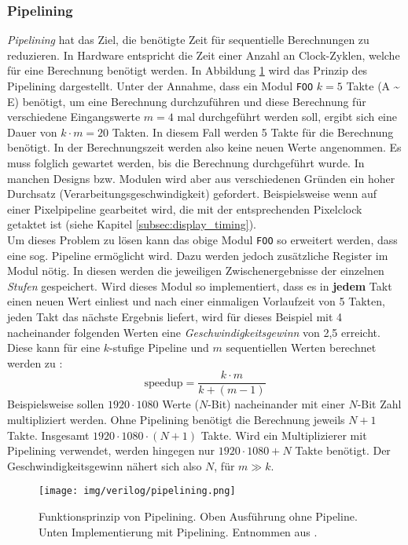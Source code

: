 \subsubsection{Pipelining}\label{subsec:pipelining}
\emph{Pipelining} hat das Ziel, die benötigte Zeit für sequentielle Berechnungen zu reduzieren. In Hardware entspricht die Zeit einer Anzahl an Clock-Zyklen, welche für eine Berechnung benötigt werden. In Abbildung \ref{fig:pipeline} wird das Prinzip des Pipelining dargestellt.
Unter der Annahme, dass ein Modul \texttt{FOO} \mbox{$ k=5 $} Takte (A  \textasciitilde\, E) benötigt, um eine Berechnung durchzuführen und diese Berechnung für verschiedene Eingangswerte $ m=4 $ mal durchgeführt werden soll, ergibt sich eine Dauer von $ k\cdot m = 20 $ Takten. In diesem Fall werden 5 Takte für die Berechnung benötigt. In der Berechnungszeit werden also keine neuen Werte angenommen. Es muss folglich gewartet werden, bis die Berechnung durchgeführt wurde. In manchen Designs bzw. Modulen wird aber aus verschiedenen Gründen ein hoher Durchsatz (Verarbeitungsgeschwindigkeit) gefordert. Beispielsweise wenn auf einer Pixelpipeline gearbeitet wird, die mit der entsprechenden Pixelclock getaktet ist (siehe Kapitel \ref{subsec:display_timing}). \\
Um dieses Problem zu lösen kann das obige Modul \texttt{FOO} so erweitert werden, dass eine sog. Pipeline ermöglicht wird. Dazu werden jedoch zusätzliche Register im Modul nötig. In diesen werden die jeweiligen Zwischenergebnisse der einzelnen \emph{Stufen} gespeichert. Wird dieses Modul so implementiert, dass es in \textbf{jedem} Takt einen neuen Wert einliest und nach einer einmaligen Vorlaufzeit von 5 Takten, jeden Takt das nächste Ergebnis liefert, wird für dieses Beispiel mit 4 nacheinander folgenden Werten eine \emph{Geschwindigkeitsgewinn} von 2,5 erreicht. Diese kann für eine $k $-stufige Pipeline und $ m $ sequentiellen Werten berechnet werden zu \cite[p.286]{molitor}:
\begin{equation}
\mathrm{speedup} = \frac{k\cdot m}{k+ (m-1)}
\end{equation}
Beispielsweise sollen $ 1920 \cdot 1080$ Werte ($ N $-Bit) nacheinander mit einer $ N $-Bit Zahl multipliziert werden. Ohne Pipelining benötigt die Berechnung jeweils $ N+1 $ Takte. Insgesamt $ 1920 \cdot 1080 \cdot (N+1) $ Takte. Wird ein Multiplizierer mit Pipelining verwendet, werden hingegen nur $ 1920 \cdot 1080 + N $ Takte benötigt. Der Geschwindigkeitsgewinn nähert sich also $ N $, für $ m \gg k $.
\begin{figure}[H]
	\centering
	\texttt{[image: img/verilog/pipelining.png]}
	\caption[Funktionsprinzip von Pipelining]{Funktionsprinzip von Pipelining. Oben Ausführung ohne Pipeline. Unten Implementierung mit Pipelining. Entnommen aus \cite{Derjavitch2012}.}
	\label{fig:pipeline}
\end{figure}

